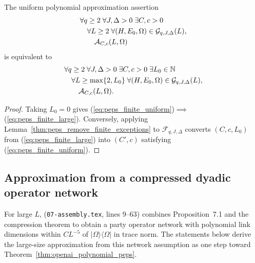 \begin{lemma}
    \label{thm:peps_approximation_iff_large}
    \leanok
    The uniform polynomial approximation assertion
    \begin{align}
         & \forall q\ge2\;\forall J,\Delta>0\;\exists C,c>0\;\label{eq:peps_finite_uniform} \\
         & \quad\forall L\ge2\;
        \forall(H,E_0,\Omega)\in\mathcal G_{q,J,\Delta}(L),\notag                           \\
         & \qquad\mathcal A_{C,c}(L,\Omega)\notag
    \end{align}
    is equivalent to
    \begin{align}
         & \forall q\ge2\;\forall J,\Delta>0\;\exists C,c>0\;
        \exists L_0\in\mathbb N\;\label{eq:peps_finite_large}     \\
         & \quad\forall L\ge\max\{2,L_0\}\;
        \forall(H,E_0,\Omega)\in\mathcal G_{q,J,\Delta}(L),\notag \\
         & \qquad\mathcal A_{C,c}(L,\Omega).\notag
    \end{align}
\end{lemma}
\begin{proof}
    \leanok
    Taking $L_0=0$ gives
    (\ref{eq:peps_finite_uniform})$\implies$(\ref{eq:peps_finite_large}).
    Conversely, applying Lemma~\ref{thm:peps_remove_finite_exceptions} to
    $\mathcal F_{q,J,\Delta}$ converts $(C,c,L_0)$ from
    (\ref{eq:peps_finite_large}) into $(C',c)$ satisfying
    (\ref{eq:peps_finite_uniform}).
\end{proof}


\subsection{Approximation from a compressed dyadic operator network}
\label{sec:peps_ground_state_assembly}

For large $L$, \cite[Section~8.1]{OpenAI2026PolynomialPEPS}
(\texttt{07-assembly.tex}, lines 9--63) combines Proposition~7.1 and the
compression theorem to obtain a party operator network with polynomial link
dimensions within $CL^{-5}$ of $|\Omega\rangle\langle\Omega|$ in trace norm.
The statements below derive the large-size approximation from this network
assumption as one step toward Theorem~\ref{thm:openai_polynomial_peps}.

